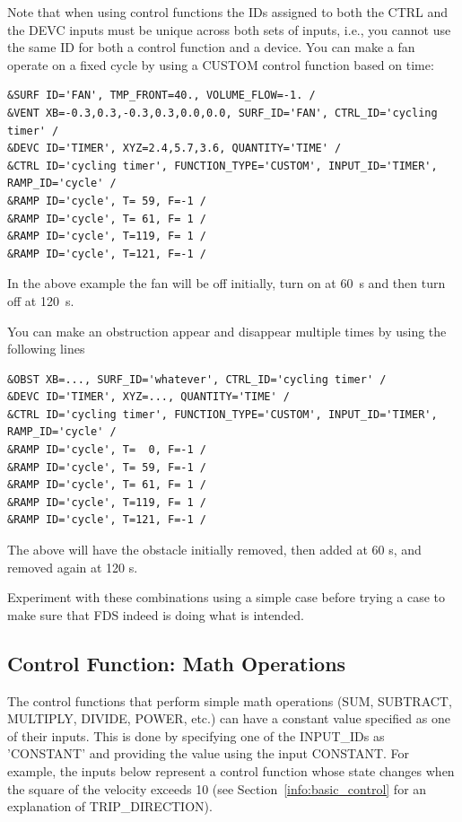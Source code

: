 \documentclass[11pt]{book}
\begin{document}
Note that when using control functions the {\ct ID}s assigned to both the {\ct CTRL} and the {\ct DEVC} inputs must be unique across both sets of inputs, i.e., you cannot use the same {\ct ID} for both a control function and a device. You can make a fan operate on a fixed cycle by using a {\ct CUSTOM} control function based on time:
\begin{lstlisting}
&SURF ID='FAN', TMP_FRONT=40., VOLUME_FLOW=-1. /
&VENT XB=-0.3,0.3,-0.3,0.3,0.0,0.0, SURF_ID='FAN', CTRL_ID='cycling timer' /
&DEVC ID='TIMER', XYZ=2.4,5.7,3.6, QUANTITY='TIME' /
&CTRL ID='cycling timer', FUNCTION_TYPE='CUSTOM', INPUT_ID='TIMER', RAMP_ID='cycle' /
&RAMP ID='cycle', T= 59, F=-1 /
&RAMP ID='cycle', T= 61, F= 1 /
&RAMP ID='cycle', T=119, F= 1 /
&RAMP ID='cycle', T=121, F=-1 /
\end{lstlisting}
In the above example the fan will be off initially, turn on at 60~s and then turn off at 120~s.

You can make an obstruction appear and disappear multiple times by using the following lines
\begin{lstlisting}
&OBST XB=..., SURF_ID='whatever', CTRL_ID='cycling timer' /
&DEVC ID='TIMER', XYZ=..., QUANTITY='TIME' /
&CTRL ID='cycling timer', FUNCTION_TYPE='CUSTOM', INPUT_ID='TIMER', RAMP_ID='cycle' /
&RAMP ID='cycle', T=  0, F=-1 /
&RAMP ID='cycle', T= 59, F=-1 /
&RAMP ID='cycle', T= 61, F= 1 /
&RAMP ID='cycle', T=119, F= 1 /
&RAMP ID='cycle', T=121, F=-1 /
\end{lstlisting}
The above will have the obstacle initially removed, then added at 60 s, and removed again at 120 s.

Experiment with these combinations using a simple case before trying a case to make sure that FDS indeed is doing what is intended.

\subsection{Control Function: Math Operations }
\label{info:CONTROL_MATH}

The control functions that perform simple math operations ({\ct SUM},  {\ct SUBTRACT},  {\ct MULTIPLY},  {\ct DIVIDE}, {\ct POWER}, etc.) can have a constant value specified as one of their inputs.  This is done by specifying one of the {\ct INPUT\_ID}s as {\ct 'CONSTANT'} and providing the value using the input {\ct CONSTANT}. For example, the inputs below represent a control function whose state changes when the square of the velocity exceeds 10 (see Section~\ref{info:basic_control} for an explanation of {\ct TRIP\_DIRECTION}).
\end{document}
